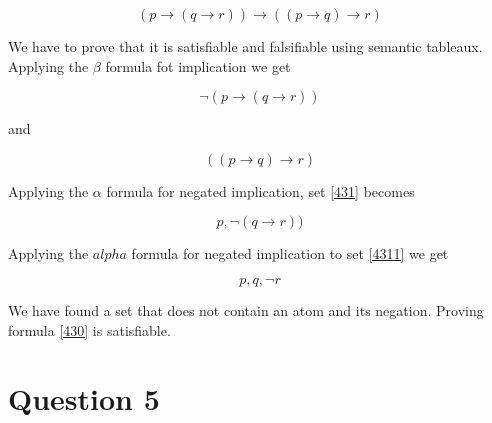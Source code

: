 \documentclass[10pt,a4paper]{article}
\begin{document}
\begin{equation}
\label{430}
(p \rightarrow (q \rightarrow r)) \rightarrow ((p \rightarrow q)  \rightarrow r)
\end{equation}

We have to prove that it is satisfiable and falsifiable using semantic tableaux. Applying the $\beta$ formula fot implication we get

\begin{equation}
\label{431}
 \neg (p \rightarrow (q \rightarrow r)) 
\end{equation}

and

\begin{equation}
 \label{432}
 ((p \rightarrow q)  \rightarrow r)
\end{equation}

Applying the $\alpha$ formula for negated implication, set \ref{431} becomes


\begin{equation}
\label{4311}
p, \neg (q \rightarrow r)) 
\end{equation}

Applying the $alpha$ formula for negated implication to set \ref{4311} we get

\begin{equation}
\label{4311}
p,q,\neg r
\end{equation}

We have found a set that does not contain an atom and its negation. Proving formula \ref{430} is satisfiable.


\section{Question 5}
\end{document}
